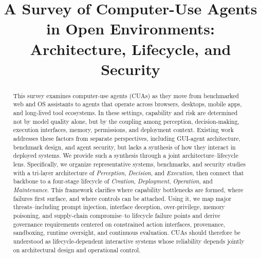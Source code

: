 \documentclass[conference]{IEEEtran}
\begin{document}
\title{A Survey of Computer-Use Agents in Open Environments: Architecture, Lifecycle, and Security}

\author{
}

\maketitle

\begin{abstract}
This survey examines computer-use agents (CUAs) as they move from benchmarked web and OS assistants to agents that operate across browsers, desktops, mobile apps, and long-lived tool ecosystems. In these settings, capability and risk are determined not by model quality alone, but by the coupling among perception, decision-making, execution interfaces, memory, permissions, and deployment context. Existing work addresses these factors from separate perspectives, including GUI-agent architecture, benchmark design, and agent security, but lacks a synthesis of how they interact in deployed systems. We provide such a synthesis through a joint architecture--lifecycle lens. Specifically, we organize representative systems, benchmarks, and security studies with a tri-layer architecture of \emph{Perception}, \emph{Decision}, and \emph{Execution}, then connect that backbone to a four-stage lifecycle of \emph{Creation}, \emph{Deployment}, \emph{Operation}, and \emph{Maintenance}. This framework clarifies where capability bottlenecks are formed, where failures first surface, and where controls can be attached. Using it, we map major threats--including prompt injection, interface deception, over-privilege, memory poisoning, and supply-chain compromise--to lifecycle failure points and derive governance requirements centered on constrained action interfaces, provenance, sandboxing, runtime oversight, and continuous evaluation. CUAs should therefore be understood as lifecycle-dependent interactive systems whose reliability depends jointly on architectural design and operational control.
\end{abstract}
\end{document}
